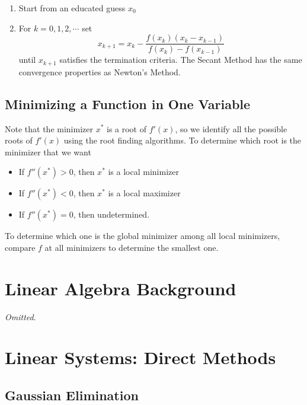 \documentclass[12pt]{scrartcl}
\begin{document}
\begin{note}
  \hfill

  \begin{enumerate}
    \item Start from an educated guess $x_0$
    \item For $k = 0, 1, 2, \cdots$ set 
    \[x_{k+1} = x_k - \frac{f(x_k)(x_k - x_{k-1})}{f(x_k) - f(x_{k-1})}\]
    until $x_{k+1}$ satisfies the termination criteria. The Secant Method has the same convergence properties 
    as Newton's Method.
  \end{enumerate}
\end{note}

\subsection{Minimizing a Function in One Variable}

\begin{note}
  Note that the minimizer $x^*$ is a root of $f'(x)$, so we identify all the possible roots 
  of $f'(x)$ using the root finding algorithms. To determine which root is the minimizer that we want 
  \begin{itemize}
    \item If $f''(x^*) > 0$, then $x^*$ is a local minimizer
    \item If $f''(x^*) < 0$, then $x^*$ is a local maximizer
    \item If $f''(x^*) = 0$, then undetermined. 
  \end{itemize}
  To determine which one is the global minimizer among all local minimizers, compare $f$ at all minimizers 
  to determine the smallest one. 
\end{note}

\section{Linear Algebra Background}

\textit{Omitted}.

\section{Linear Systems: Direct Methods}

\subsection{Gaussian Elimination}
\end{document}
